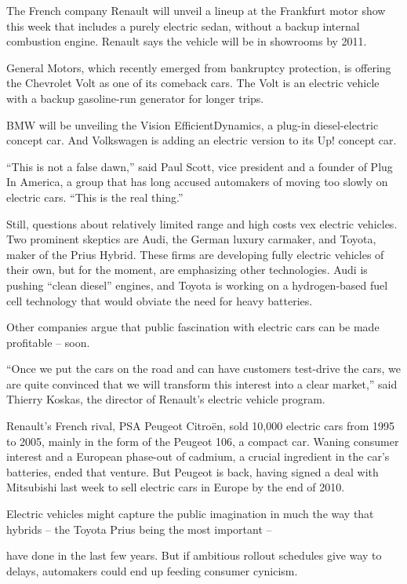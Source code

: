 ﻿\documentclass[12pt]{article}
\begin{document}
The French company Renault will unveil a lineup at the Frankfurt motor show this week that includes
a purely electric sedan, without a backup internal combustion engine. Renault says the vehicle will
be in showrooms by 2011.

General Motors, which recently emerged from bankruptcy protection, is offering the Chevrolet Volt as
one of its comeback cars. The Volt is an electric vehicle with a backup gasoline-run generator for
longer trips.

BMW will be unveiling the Vision EfficientDynamics, a plug-in diesel\cite{diesel}-electric concept
car. And Volkswagen is adding an electric version to its Up! concept car.

``This is not a false dawn,'' said Paul Scott, vice president and a founder of Plug In America, a
group that has long accused automakers of moving too slowly on electric cars. ``This is the real
thing.''

Still, questions about relatively limited range and high costs vex electric vehicles. Two prominent
skeptics are Audi, the German luxury carmaker, and Toyota, maker of the Prius Hybrid. These firms
are developing fully electric vehicles of their own, but for the moment, are emphasizing other
technologies. Audi is pushing ``clean diesel'' engines, and Toyota is working on a hydrogen-based
fuel cell technology that would obviate the need for heavy batteries.

Other companies argue that public fascination with electric cars can be made profitable -- soon.

``Once we put the cars on the road and can have customers test-drive the cars, we are quite
convinced that we will transform this interest into a clear market,'' said Thierry Koskas, the
director of Renault's electric vehicle program.

Renault's French rival, PSA Peugeot Citro\"en, sold 10,000 electric cars from 1995 to 2005, mainly
in the form of the Peugeot 106, a compact car. Waning consumer interest and a European phase-out of
cadmium, a crucial ingredient in the car's batteries, ended that venture. But Peugeot is back,
having signed a deal with Mitsubishi last week to sell electric cars in Europe by the end of 2010.

Electric vehicles might capture the public imagination in much the way that hybrids -- the Toyota
Prius being the most important --

have done in the last few years. But if ambitious rollout schedules give way to delays, automakers
could end up feeding consumer cynicism\cite{cynicism}.
\end{document}
